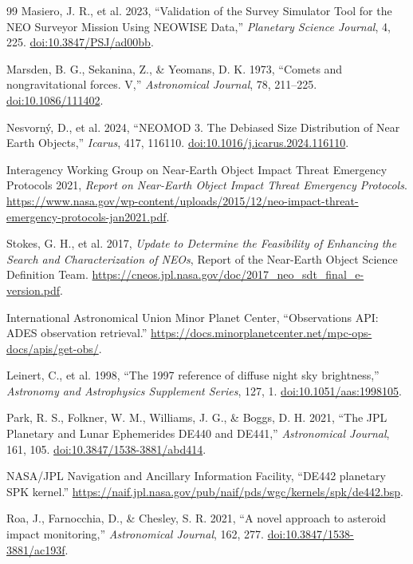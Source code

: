 \begin{thebibliography}{99}
Masiero, J. R., et al. 2023,
``Validation of the Survey Simulator Tool for the NEO Surveyor Mission Using
NEOWISE Data,''
\textit{Planetary Science Journal}, 4, 225.
\href{https://doi.org/10.3847/PSJ/ad00bb}{doi:10.3847/PSJ/ad00bb}.

Marsden, B. G., Sekanina, Z., \& Yeomans, D. K. 1973,
``Comets and nongravitational forces. V,''
\textit{Astronomical Journal}, 78, 211--225.
\href{https://doi.org/10.1086/111402}{doi:10.1086/111402}.

Nesvorn\'y, D., et al. 2024,
``NEOMOD 3. The Debiased Size Distribution of Near Earth Objects,''
\textit{Icarus}, 417, 116110.
\href{https://doi.org/10.1016/j.icarus.2024.116110}{doi:10.1016/j.icarus.2024.116110}.

Interagency Working Group on Near-Earth Object Impact Threat Emergency
Protocols 2021,
\textit{Report on Near-Earth Object Impact Threat Emergency Protocols}.
\url{https://www.nasa.gov/wp-content/uploads/2015/12/neo-impact-threat-emergency-protocols-jan2021.pdf}.

Stokes, G. H., et al. 2017,
\textit{Update to Determine the Feasibility of Enhancing the Search and
Characterization of NEOs},
Report of the Near-Earth Object Science Definition Team.
\url{https://cneos.jpl.nasa.gov/doc/2017_neo_sdt_final_e-version.pdf}.

International Astronomical Union Minor Planet Center,
``Observations API: ADES observation retrieval.''
\url{https://docs.minorplanetcenter.net/mpc-ops-docs/apis/get-obs/}.

Leinert, C., et al. 1998,
``The 1997 reference of diffuse night sky brightness,''
\textit{Astronomy and Astrophysics Supplement Series}, 127, 1.
\href{https://doi.org/10.1051/aas:1998105}{doi:10.1051/aas:1998105}.

Park, R. S., Folkner, W. M., Williams, J. G., \& Boggs, D. H. 2021,
``The JPL Planetary and Lunar Ephemerides DE440 and DE441,''
\textit{Astronomical Journal}, 161, 105.
\href{https://doi.org/10.3847/1538-3881/abd414}{doi:10.3847/1538-3881/abd414}.

NASA/JPL Navigation and Ancillary Information Facility,
``DE442 planetary SPK kernel.''
\url{https://naif.jpl.nasa.gov/pub/naif/pds/wgc/kernels/spk/de442.bsp}.

Roa, J., Farnocchia, D., \& Chesley, S. R. 2021,
``A novel approach to asteroid impact monitoring,''
\textit{Astronomical Journal}, 162, 277.
\href{https://doi.org/10.3847/1538-3881/ac193f}{doi:10.3847/1538-3881/ac193f}.


\end{thebibliography}
